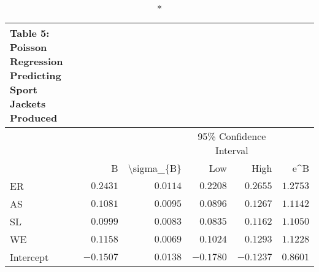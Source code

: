\begin{longtable}{l|rrrrr}
\caption*{
{\large Table 5: Poisson Regression Predicting Sport Jackets Produced}
} \\ 
\toprule
\multicolumn{1}{l}{} &  &  & \multicolumn{2}{c}{95\% Confidence Interval} &  \\ 
\cmidrule(lr){4-5}
\multicolumn{1}{l}{} & B & \textbackslash{}sigma\_\{B\} & Low & High & e\textasciicircum{}B \\ 
\midrule\addlinespace[2.5pt]
ER & $0.2431$ & $0.0114$ & $0.2208$ & $0.2655$ & $1.2753$ \\ 
AS & $0.1081$ & $0.0095$ & $0.0896$ & $0.1267$ & $1.1142$ \\ 
SL & $0.0999$ & $0.0083$ & $0.0835$ & $0.1162$ & $1.1050$ \\ 
WE & $0.1158$ & $0.0069$ & $0.1024$ & $0.1293$ & $1.1228$ \\ 
Intercept & $-0.1507$ & $0.0138$ & $-0.1780$ & $-0.1237$ & $0.8601$ \\ 
\bottomrule
\end{longtable}

